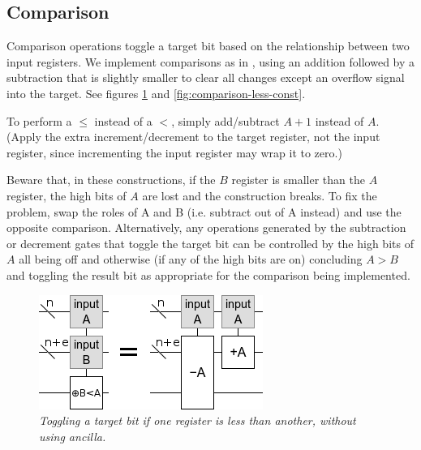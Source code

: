 \documentclass[twocolumn]{article}
\begin{document}
\subsection{Comparison}

Comparison operations toggle a target bit based on the relationship between two input registers.
We implement comparisons as in \cite{takahashi2005}, using an addition followed by a subtraction that is slightly smaller to clear all changes except an overflow signal into the target.
See figures \ref{fig:comparison-less} and \ref{fig:comparison-less-const}.

To perform a $\leq$ instead of a $<$, simply add/subtract $A+1$ instead of $A$.
(Apply the extra increment/decrement to the target register, not the input register, since incrementing the input register may wrap it to zero.)

Beware that,  in these constructions, if the $B$ register is smaller than the $A$ register, the high bits of $A$ are lost and the construction breaks.
To fix the problem, swap the roles of A and B (i.e. subtract out of A instead) and use the opposite comparison.
Alternatively, any operations generated by the subtraction or decrement gates that toggle the target bit can be controlled by the high bits of $A$ all being off and otherwise (if any of the high bits are on) concluding $A>B$ and toggling the result bit as appropriate for the comparison being implemented.

\begin{figure}
  \centering
  \includegraphics[width=\linewidth]{assets/comparison-less.png}
  \caption{\em Toggling a target bit if one register is less than another, without using ancilla.}
  \label{fig:comparison-less}
\end{figure}
\end{document}

